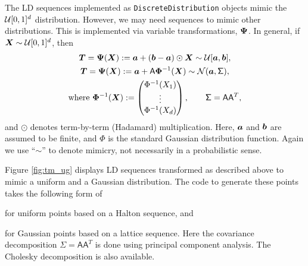 \documentclass[graybox,footinfo]{svmult}
\newcommand{\mA}{\mathsf{A}}
\newcommand{\mSigma}{\mathsf{\Sigma}}
\begin{document}
The LD sequences implemented as \texttt{DiscreteDistribution} objects mimic the ${\mathcal{U}}[0,1]^d$ distribution.  However, we may need sequences to mimic other distributions.  This is implemented via variable transformations, ${\boldsymbol{\Psi}}$.  In general, if ${\boldsymbol{X}} \sim {\mathcal{U}}[0,1]^d$, then
\begin{subequations} \label{eq:exampleVarTrans}
\begin{gather}
\bsT = \bsPsi(\bsX) := \bsa  + (\bsb - \bsa) \odot \bsX \sim  \calU[\bsa,\bsb], \\
\label{eq:exampleVarTransGauss}
\bsT = \bsPsi(\bsX) := \bsa + \mA \bsPhi^{-1}(\bsX)  \sim \calN(\bsa, \mSigma), \\
\nonumber  \text{where }  \bsPhi^{-1}(\bsX) : = \begin{pmatrix} \Phi^{-1}(X_1) \\ \vdots \\ \Phi^{-1}(X_d)\end{pmatrix}, \qquad \mSigma = \mA \mA^T,
\end{gather}
\end{subequations}
and $\odot$ denotes term-by-term (Hadamard) multiplication.  Here, ${\boldsymbol{a}}$ and ${\boldsymbol{b}}$ are assumed to be finite, and $\Phi$ is the standard Gaussian distribution function.  Again we use ``$\sim$'' to denote mimicry, not necessarily in a probabilistic sense.

Figure \ref{fig:tm_ug} displays LD sequences transformed as described above to mimic a uniform and a Gaussian distribution.  The code to generate these points takes the following form of 

for uniform points based on a Halton sequence, and 

for Gaussian points based on a lattice sequence. Here the covariance decomposition $\mSigma = \mA \mA^T$ is done using principal component analysis. The Cholesky decomposition is also available.
\end{document}
